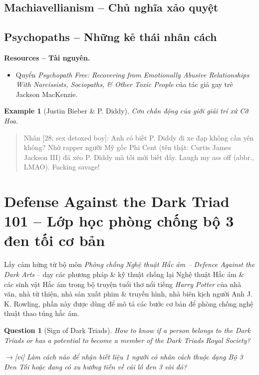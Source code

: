 \documentclass[12pt,twoside]{book}
\newtheorem{example}{Example}
\newtheorem{question}{Question}
\begin{document}
\subsection{Machiavellianism -- Chủ nghĩa xảo quyệt}

\subsection{Psychopaths -- Những kẻ thái nhân cách}
{\bf \textsf{Resources -- Tài nguyên.}}
\begin{itemize}
	\item Quyển {\it Psychopath Free: Recovering from Emotionally Abusive Relationships With Narcissists, Sociopaths, \& Other Toxic People} \cite{MacKenzie2015} của tác giả gay trẻ {\sc Jackson MacKenzie}.
\end{itemize}

\begin{example}[{\sc Justin Bieber} \& {\sc P. Diddy}]
	Cơn chấn động của giới giải trí xứ Cờ Hoa.
\end{example}

\begin{quote}
	{\sf Nhân [28; sex detoxed boy]}: Anh có biết {\sc P. Diddy} đi xe đạp không cần yên không? Nhờ rapper ngưỡi Mỹ gốc Phi { Cent} (tên thật: {\sc Curtis James Jackson III}) đá xéo {\sc P. Diddy} mà tôi mới biết đấy. Laugh my ass off (abbr., LMAO). Fucking savage!
\end{quote}

\section{Defense Against the Dark Triad 101 -- Lớp học phòng chống bộ 3 đen tối cơ bản}
Lấy cảm hứng từ bộ môn {\it Phòng chống Nghệ thuật Hắc ám -- Defence Against the Dark Arts} -- dạy các phương pháp \& kỹ thuật chống lại Nghệ thuật Hắc ám \& các sinh vật Hắc ám trong bộ truyện tuổi thơ nổi tiếng {\it Harry Potter} của nhà văn, nhà từ thiện, nhà sản xuất phim \& truyền hình, nhà biên kịch người Anh {\sc J. K. Rowling}, phần này được dùng để mô tả các bước cơ bản để phòng chống nghệ thuật thao túng hắc ám.

\begin{question}[Sign of Dark Triads]
	How to know if a person belongs to the Dark Triads or has a potential to become a member of the Dark Triads Royal Society?
	
	{\sf[en]$\to$[vi]} Làm cách nào để nhận biết liệu 1 người có nhân cách thuộc dạng Bộ 3 Đen Tối hoặc đang có xu hướng tiến về cái lỗ đen 3 vòi đó?
\end{question}
\end{document}
